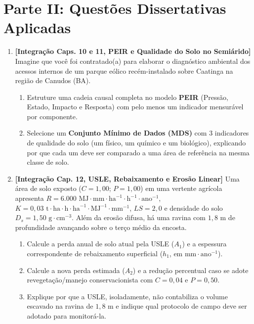 \section*{Parte II: Questões Dissertativas Aplicadas}

\begin{enumerate}[leftmargin=1.8em, itemsep=8pt, start=9]
  \item \textbf{[Integração Caps. 10 e 11, PEIR e Qualidade do Solo no Semiárido]} Imagine que você foi contratado(a) para elaborar o diagnóstico ambiental dos acessos internos de um parque eólico recém-instalado sobre Caatinga na região de Canudos (BA).
  \begin{enumerate}[label=(\alph*), leftmargin=1.6em, itemsep=2pt]
    \item Estruture uma cadeia causal completa no modelo \textbf{PEIR} (Pressão, Estado, Impacto e Resposta) com pelo menos um indicador mensurável por componente.
    \item Selecione um \textbf{Conjunto Mínimo de Dados (MDS)} com $3$ indicadores de qualidade do solo (um físico, um químico e um biológico), explicando por que cada um deve ser comparado a uma área de referência na mesma classe de solo.
  \end{enumerate}
  \espacoResolucao[4.0cm]

  \item \textbf{[Integração Cap. 12, USLE, Rebaixamento e Erosão Linear]} Uma área de solo exposto ($C = 1{,}00$; $P = 1{,}00$) em uma vertente agrícola apresenta $R = 6.000\text{ MJ}\cdot\text{mm}\cdot\text{ha}^{-1}\cdot\text{h}^{-1}\cdot\text{ano}^{-1}$, $K = 0{,}03\text{ t}\cdot\text{ha}\cdot\text{h}\cdot\text{ha}^{-1}\cdot\text{MJ}^{-1}\cdot\text{mm}^{-1}$, $LS = 2{,}0$ e densidade do solo $D_s = 1{,}50\text{ g}\cdot\text{cm}^{-3}$. Além da erosão difusa, há uma ravina com $1{,}8\text{ m}$ de profundidade avançando sobre o terço médio da encosta.
  \begin{enumerate}[label=(\alph*), leftmargin=1.6em, itemsep=2pt]
    \item Calcule a perda anual de solo atual pela USLE ($A_1$) e a espessura correspondente de rebaixamento superficial ($h_1$, em $\text{mm}\cdot\text{ano}^{-1}$).
    \item Calcule a nova perda estimada ($A_2$) e a redução percentual caso se adote revegetação/manejo conservacionista com $C = 0{,}04$ e $P = 0{,}50$.
    \item Explique por que a USLE, isoladamente, não contabiliza o volume escavado na ravina de $1{,}8\text{ m}$ e indique qual protocolo de campo deve ser adotado para monitorá-la.
  \end{enumerate}
  \espacoResolucao[4.2cm]
\end{enumerate}

